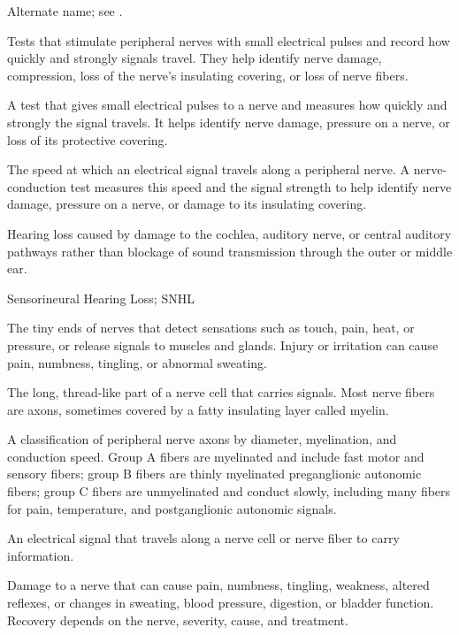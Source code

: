  Alternate name; see .

 Tests that stimulate peripheral nerves with small electrical pulses and record how quickly and strongly signals travel. They help identify nerve damage, compression, loss of the nerve’s insulating covering, or loss of nerve fibers.

 A test that gives small electrical pulses to a nerve and measures how quickly and strongly the signal travels. It helps identify nerve damage, pressure on a nerve, or loss of its protective covering.

 The speed at which an electrical signal travels along a peripheral nerve. A nerve-conduction test measures this speed and the signal strength to help identify nerve damage, pressure on a nerve, or damage to its insulating covering.

 Hearing loss caused by damage to the cochlea, auditory nerve, or central auditory pathways rather than blockage of sound transmission through the outer or middle ear.

\synonyms
Sensorineural Hearing Loss; SNHL

 The tiny ends of nerves that detect sensations such as touch, pain, heat, or pressure, or release signals to muscles and glands. Injury or irritation can cause pain, numbness, tingling, or abnormal sweating.

 The long, thread-like part of a nerve cell that carries signals. Most nerve fibers are axons, sometimes covered by a fatty insulating layer called myelin.

 A classification of peripheral nerve axons by diameter, myelination, and conduction speed. Group A fibers are myelinated and include fast motor and sensory fibers; group B fibers are thinly myelinated preganglionic autonomic fibers; group C fibers are unmyelinated and conduct slowly, including many fibers for pain, temperature, and postganglionic autonomic signals.


 An electrical signal that travels along a nerve cell or nerve fiber to carry information.

 Damage to a nerve that can cause pain, numbness, tingling, weakness, altered reflexes, or changes in sweating, blood pressure, digestion, or bladder function. Recovery depends on the nerve, severity, cause, and treatment.

